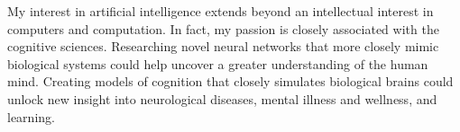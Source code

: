 \documentclass[12pt]{article}
\begin{document}
My interest in artificial intelligence extends beyond an intellectual interest in computers and computation. In fact, my passion is closely
associated with the cognitive sciences.  Researching novel neural networks that more closely mimic biological systems could help uncover
a greater understanding of the human mind. Creating models of cognition that closely simulates biological brains could unlock new insight
into neurological diseases, mental illness and wellness, and learning.
\end{document}
